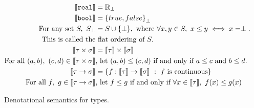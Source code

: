 \begin{figure}
 \begin{align*}
\llbracket \texttt{real} \rrbracket &= \mathbb{R}_{\perp} \\
 \llbracket \texttt{bool} \rrbracket &= {\{true, false\}}_{\perp} \\
\text{For any set } S, \ S_{\perp} &= S \cup \{\perp\}, \text{ where }\forall x, y\in S, \ x \leq y \iff x = \perp. \\
 \text{This is called the}&\text{ flat ordering of } S.\\
 \llbracket \tau \times \sigma \rrbracket &= \llbracket \tau \rrbracket \times \llbracket \sigma \rrbracket  \\
 \text{For all } (a, b), \ (c, d) \in \llbracket \tau \times \sigma \rrbracket &\text{, let }  (a,b) \leq (c,d) \text{ if and only if } a\leq c \text{ and } b \leq d. \\ 
 \llbracket \tau \rightarrow \sigma \rrbracket &= \{f: \llbracket \tau \rrbracket \rightarrow \llbracket \sigma \rrbracket \ : 
 \ f \text{ is continuous}\} \\
 \text{ For all } f, \ g \in \llbracket \tau \rightarrow \sigma \rrbracket &\text{, let } f \leq g \text{ if and only if } \forall x \in 
 \llbracket \tau \rrbracket, \ f(x) \leq g(x) 
 \end{align*}
 \caption{Denotational semantics for types.}
 \end{figure}
